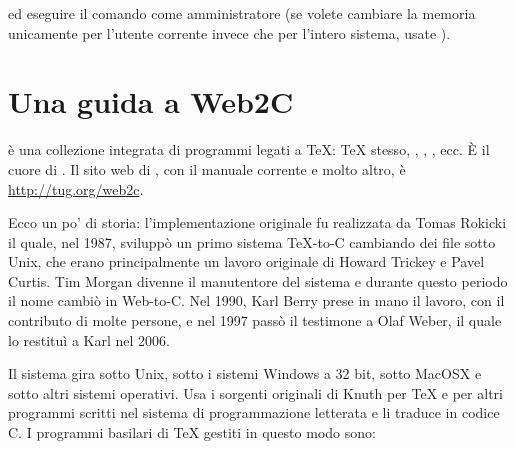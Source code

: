 \documentclass{article}
\begin{document}
\noindent ed eseguire il comando  come
amministratore (se volete cambiare la memoria unicamente per l'utente
corrente invece che per l'intero sistema, usate ).


\section{Una guida a Web2C}

\Webc{} è una collezione integrata di programmi legati a \TeX: \TeX{}
stesso, \MF{}, \MP, \BibTeX{}, ecc. È il cuore di \TL{}. Il sito web di
\Webc{}, con il manuale corrente e molto altro, è
\url{http://tug.org/web2c}.

Ecco un po' di storia: l'implementazione originale fu realizzata da Tomas
Rokicki il quale, nel 1987, sviluppò un primo sistema \TeX{}-to-C
cambiando dei file sotto Unix, che erano principalmente un lavoro
originale di Howard Trickey e Pavel Curtis. Tim Morgan divenne il
manutentore del sistema e durante questo periodo il nome cambiò in
Web-to-C\@. Nel 1990, Karl Berry prese in mano il lavoro, con il
contributo di molte persone, e nel 1997 passò il testimone a Olaf Weber,
il quale lo restituì a Karl nel 2006.

Il sistema \Webc{} gira sotto Unix, sotto i sistemi Windows a 32 bit,
sotto MacOSX{} e sotto altri sistemi operativi. Usa i sorgenti originali
di Knuth per \TeX{} e per altri programmi scritti nel sistema di
programmazione letterata \web{} e li traduce in codice C. I programmi
basilari di \TeX{} gestiti in questo modo sono:
\end{document}
